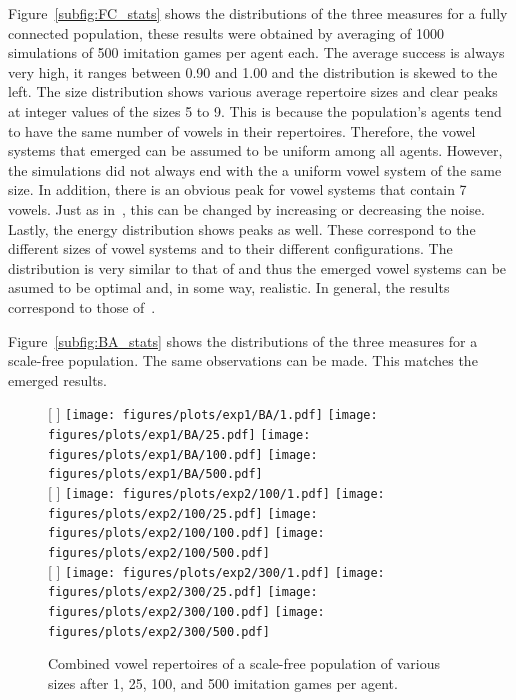 \documentclass{article}
\begin{document}
Figure~\ref{subfig:FC_stats} shows the distributions of the three measures for a fully connected population, these results were obtained by averaging of 1000 simulations of 500 imitation games per
agent each. The average success is always very high, it ranges between 0.90 and 1.00 and the distribution is skewed to the left. The size distribution shows various average repertoire sizes and clear
peaks at integer values of the sizes 5 to 9. This is because the population's agents tend to have the same number of vowels in their repertoires. Therefore, the vowel systems that emerged can be
assumed to be uniform among all agents. However, the simulations did not always end with the a uniform vowel system of the same size. In addition, there is an obvious peak for vowel systems that
contain 7 vowels. Just as in~, this can be changed by increasing or decreasing the noise.
Lastly, the energy distribution shows peaks as well. These correspond to the different sizes of vowel systems and to their different configurations. The distribution is very similar to that of
 and thus the emerged vowel systems can be asumed to be optimal and, in some way, realistic.
In general, the results correspond to those of~.

Figure~\ref{subfig:BA_stats} shows the distributions of the three measures for a scale-free population.
The same observations can be made. This matches the emerged results.

\begin{figure}[t]
    \centering
    [%
        \textwidth %
    ]%
    {%
        \texttt{[image: figures/plots/exp1/BA/1.pdf]}
        \texttt{[image: figures/plots/exp1/BA/25.pdf]}
        \texttt{[image: figures/plots/exp1/BA/100.pdf]}
        \texttt{[image: figures/plots/exp1/BA/500.pdf]}
    }%
    \\\bigskip
    [%
        \textwidth %
    ]%
    {%
        \texttt{[image: figures/plots/exp2/100/1.pdf]}
        \texttt{[image: figures/plots/exp2/100/25.pdf]}
        \texttt{[image: figures/plots/exp2/100/100.pdf]}
        \texttt{[image: figures/plots/exp2/100/500.pdf]}
    }%
    \\\bigskip
    [%
        \textwidth %
    ]%
    {%
        \texttt{[image: figures/plots/exp2/300/1.pdf]}
        \texttt{[image: figures/plots/exp2/300/25.pdf]}
        \texttt{[image: figures/plots/exp2/300/100.pdf]}
        \texttt{[image: figures/plots/exp2/300/500.pdf]}
    }%
    \caption{Combined vowel repertoires of a scale-free population of various sizes after 1, 25, 100, and 500
        imitation games per agent.}
    \label{fig:res_2}
\end{figure}
\end{document}
